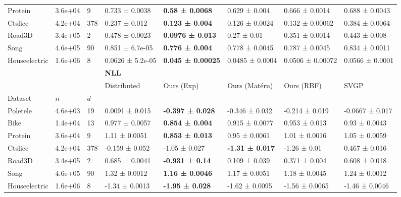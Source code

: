 \begin{table}[ht]
\begin{tabularx}{\textwidth}{llllllll}
Protein & 3.6e+04 & 9 & 0.733 ± 0.0038 & \bfseries 0.58 ± 0.0068 & 0.629 ± 0.004 & 0.666 ± 0.0014 & 0.688 ± 0.0043 \\
Ctslice & 4.2e+04 & 378 & 0.237 ± 0.012 & \bfseries 0.123 ± 0.004 & 0.126 ± 0.0024 & 0.132 ± 0.00062 & 0.384 ± 0.0064 \\
Road3D & 3.4e+05 & 2 & 0.478 ± 0.0023 & \bfseries 0.0976 ± 0.013 & 0.27 ± 0.01 & 0.351 ± 0.0014 & 0.443 ± 0.008 \\
Song & 4.6e+05 & 90 & 0.851 ± 6.7e-05 & \bfseries 0.776 ± 0.004 & 0.778 ± 0.0045 & 0.787 ± 0.0045 & 0.834 ± 0.0011 \\
Houseelectric & 1.6e+06 & 8 & 0.0626 ± 5.2e-05 & \bfseries 0.045 ± 0.00025 & 0.0485 ± 0.0004 & 0.0506 ± 0.00072 & 0.0566 ± 0.0001 \\
\bottomrule
\toprule
 &  &  & \multicolumn{5}{l}{\textbf{NLL}} \\
 &  &  & Distributed & Ours (Exp) & Ours (Matérn) & Ours (RBF) & SVGP \\
Dataset & \(n\) & \(d\) &  &  &  &  &  \\
\midrule
Poletele & 4.6e+03 & 19 & 0.0091 ± 0.015 & \bfseries -0.397 ± 0.028 & -0.346 ± 0.032 & -0.214 ± 0.019 & -0.0667 ± 0.017 \\
Bike & 1.4e+04 & 13 & 0.977 ± 0.0057 & \bfseries 0.854 ± 0.004 & 0.915 ± 0.0077 & 0.953 ± 0.013 & 0.93 ± 0.0043 \\
Protein & 3.6e+04 & 9 & 1.11 ± 0.0051 & \bfseries 0.853 ± 0.013 & 0.95 ± 0.0061 & 1.01 ± 0.0016 & 1.05 ± 0.0059 \\
Ctslice & 4.2e+04 & 378 & -0.159 ± 0.052 & -1.05 ± 0.027 & \bfseries -1.31 ± 0.017 & -1.26 ± 0.01 & 0.467 ± 0.016 \\
Road3D & 3.4e+05 & 2 & 0.685 ± 0.0041 & \bfseries -0.931 ± 0.14 & 0.109 ± 0.039 & 0.371 ± 0.004 & 0.608 ± 0.018 \\
Song & 4.6e+05 & 90 & 1.32 ± 0.0012 & \bfseries 1.16 ± 0.0046 & 1.17 ± 0.0051 & 1.18 ± 0.0045 & 1.24 ± 0.0012 \\
Houseelectric & 1.6e+06 & 8 & -1.34 ± 0.0013 & \bfseries -1.95 ± 0.028 & -1.62 ± 0.0095 & -1.56 ± 0.0065 & -1.46 ± 0.0046 \\
\bottomrule
\end{tabularx}
\end{table}

